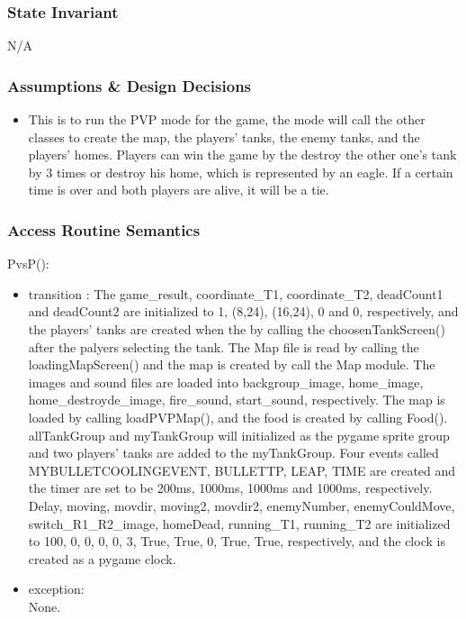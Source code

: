 \documentclass[12pt, titlepage]{article}
\begin{document}
		\subsubsection{State Invariant}
		N/A
		
		\subsubsection{Assumptions \& Design Decisions}
		\begin{itemize}
		\item This is to run the PVP mode for the game, the mode will call the other classes to create the map, the players' tanks, the enemy tanks, and the players' homes. Players can win the game by the destroy the other one's tank by 3 times or destroy his home, which is represented by an eagle. If a certain time is over and both players are alive, it will be a tie. 
		\end{itemize}
		\subsubsection{Access Routine Semantics}
		PvsP():
		\begin{itemize}
		\item transition : The game\_result, coordinate\_T1, coordinate\_T2, deadCount1 and deadCount2 are initialized to 1, (8,24), (16,24), 0 and 0, respectively, and the players' tanks are created when the by calling the choosenTankScreen() after the palyers selecting the tank. The Map file is read by calling the loadingMapScreen() and the map is created by call the Map module. The images and sound files are loaded into backgroup\_image, home\_image, home\_destroyde\_image, fire\_sound, start\_sound, respectively. The map is loaded by calling loadPVPMap(), and the food is created by calling Food(). allTankGroup and myTankGroup will initialized as the pygame sprite group and two players' tanks are added to the myTankGroup. Four events called MYBULLETCOOLINGEVENT, BULLETTP, LEAP, TIME are created and the timer are set to be 200ms, 1000ms, 1000ms and 1000ms, respectively. Delay, moving, movdir, moving2, movdir2, enemyNumber, enemyCouldMove, switch\_R1\_R2\_image, homeDead, running\_T1, running\_T2 are initialized to 100, 0, 0, 0, 0, 3, True, True, 0, True, True, respectively, and the clock is created as a pygame clock.
		
		\item exception:\\None.
		\end{itemize}
		
\end{document}
